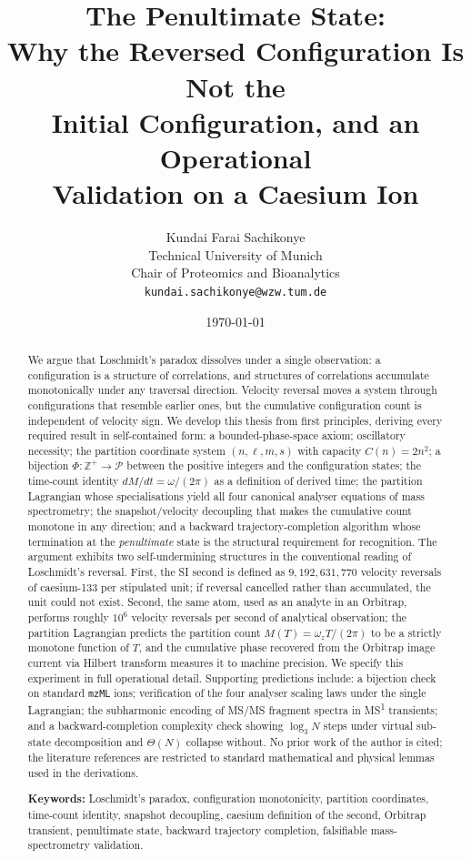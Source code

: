\documentclass[twocolumn,10pt,a4paper]{article}
\title{\textbf{The Penultimate State:\\
Why the Reversed Configuration Is Not the\\
Initial Configuration, and an Operational\\
Validation on a Caesium Ion}}
\author{
Kundai Farai Sachikonye\\
Technical University of Munich\\
Chair of Proteomics and Bioanalytics\\
\texttt{kundai.sachikonye@wzw.tum.de}
}
\date{\today}
\theoremstyle{thmstyle}
\theoremstyle{definition}
\theoremstyle{remark}
\newcommand{\Zp}{\mathbb{Z}^{+}}
\newcommand{\Parts}{\mathcal{P}}
\newcommand{\PhiMap}{\varPhi}
\begin{document}
\maketitle

\begin{abstract}
\noindent
We argue that Loschmidt's paradox dissolves under a single observation:
a configuration is a structure of correlations, and structures of
correlations accumulate monotonically under any traversal direction.
Velocity reversal moves a system through configurations that resemble
earlier ones, but the cumulative configuration count is independent of
velocity sign. We develop this thesis from first principles, deriving
every required result in self-contained form: a bounded-phase-space
axiom; oscillatory necessity; the partition coordinate system
$(n,\ell,m,s)$ with capacity $C(n)=2n^{2}$; a bijection
$\PhiMap:\Zp\to\Parts$ between the positive integers and the
configuration states; the time-count identity $dM/dt=\omega/(2\pi)$ as
a definition of derived time; the partition Lagrangian whose
specialisations yield all four canonical analyser equations of mass
spectrometry; the snapshot/velocity decoupling that makes the
cumulative count monotone in any direction; and a backward
trajectory-completion algorithm whose termination at the
\emph{penultimate} state is the structural requirement for
recognition. The argument exhibits two self-undermining structures
in the conventional reading of Loschmidt's reversal. First, the SI
second is defined as $9{,}192{,}631{,}770$ velocity reversals of
caesium-133 per stipulated unit; if reversal cancelled rather than
accumulated, the unit could not exist. Second, the same atom, used as
an analyte in an Orbitrap, performs roughly $10^{6}$ velocity reversals
per second of analytical observation; the partition Lagrangian
predicts the partition count $M(T)=\omega_{z}T/(2\pi)$ to be a strictly
monotone function of $T$, and the cumulative phase recovered from the
Orbitrap image current via Hilbert transform measures it to machine
precision. We specify this experiment in full operational detail.
Supporting predictions include: a bijection check on standard
\texttt{mzML} ions; verification of the four analyser scaling laws
under the single Lagrangian; the subharmonic encoding of MS/MS fragment
spectra in MS\textsuperscript{1} transients; and a backward-completion
complexity check showing $\log_{3}N$ steps under virtual sub-state
decomposition and $\Theta(N)$ collapse without. No prior work of the
author is cited; the literature references are restricted to standard
mathematical and physical lemmas used in the derivations.

\medskip
\noindent\textbf{Keywords:} Loschmidt's paradox, configuration
monotonicity, partition coordinates, time-count identity, snapshot
decoupling, caesium definition of the second, Orbitrap transient,
penultimate state, backward trajectory completion, falsifiable
mass-spectrometry validation.
\end{abstract}
\end{document}
